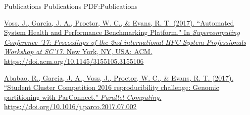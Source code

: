 \documentclass[letterpaper,MMMyyyy,nonstopmode]{simpleresumecv}
\begin{document}
\begin{Body}
\Section
{Publications}
{Publications}
{PDF:Publications}

\Entry
\href{http://doi.acm.org/10.1145/3155105.3155106}
{\underline{Voss, J.}, Garcia, J. A., Proctor, W. C., \& Evans, R. T.
(2017). ``Automated System Health and Performance Benchmarking Platform."
In \textit{Supercomputing Conference '17: Proceedings of the 2nd international
HPC System Professionals Workshop at SC'17}. New York, NY, USA: ACM.
https://doi.acm.org/10.1145/3155105.3155106}
\Gap

\Entry
\href{https://doi.org/10.1016/j.parco.2017.07.002}
{Ababao, R., Garcia, J. A., \underline{Voss, J.}, Proctor, W. C., \& Evans, R.
T. (2017). ``Student Cluster Competition 2016 reproducibility challenge: Genomic
partitioning with ParConnect." \textit{Parallel Computing.}
https://doi.org/10.1016/j.parco.2017.07.002}


% 
% 
% 

\end{Body}
\end{document}
